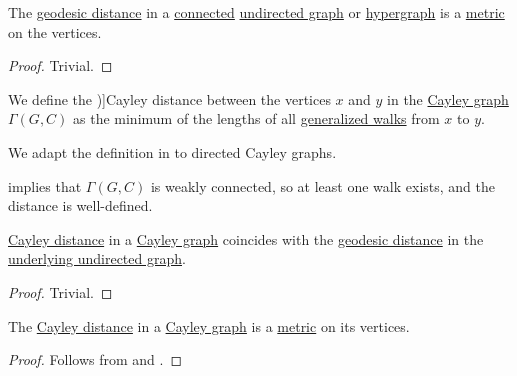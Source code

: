\begin{proposition}\label{thm:graph_geodesic_distance_is_metric}
  The \hyperref[def:graph_geodesic_distance]{geodesic distance} in a \hyperref[def:graph_connectedness/undirected]{connected} \hyperref[def:undirected_graph]{undirected graph} or \hyperref[def:hypergraph]{hypergraph} is a \hyperref[def:metric_space]{metric} on the vertices.
\end{proposition}
\begin{proof}
  Trivial.
\end{proof}

\begin{definition}\label{def:cayley_distance}\mimprovised
  We define the \term[en=Cayley distance (\cite[def. 2.1.10]{HadelerMüller2017CellularAutomata})]{Cayley distance} between the vertices \( x \) and \( y \) in the \hyperref[def:cayley_graph]{Cayley graph} \( \Gamma(G, C) \) as the minimum of the lengths of all \hyperref[def:graph_walk/generalized]{generalized walks} from \( x \) to \( y \).
\end{definition}
\begin{comments}
  \item We adapt the definition in  to directed Cayley graphs.
\end{comments}
\begin{defproof}
   implies that \( \Gamma(G, C) \) is weakly connected, so at least one walk exists, and the distance is well-defined.
\end{defproof}

\begin{proposition}\label{thm:cayley_and_geodesic_distance}
  \hyperref[def:cayley_distance]{Cayley distance} in a \hyperref[def:cayley_graph]{Cayley graph} coincides with the \hyperref[def:graph_geodesic_distance]{geodesic distance} in the \hyperref[def:multigraph_orientation]{underlying undirected graph}.
\end{proposition}
\begin{proof}
  Trivial.
\end{proof}

\begin{corollary}\label{thm:cayley_distance_is_metric}
  The \hyperref[def:cayley_distance]{Cayley distance} in a \hyperref[def:cayley_graph]{Cayley graph} is a \hyperref[def:metric_space]{metric} on its vertices.
\end{corollary}
\begin{proof}
  Follows from  and .
\end{proof}

